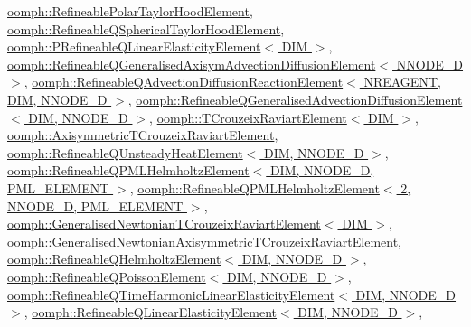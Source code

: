 \hyperlink{classoomph_1_1RefineablePolarTaylorHoodElement_a227872425bda8de11fd94b625eeffbd0}{oomph\+::\+Refineable\+Polar\+Taylor\+Hood\+Element}, \hyperlink{classoomph_1_1RefineableQSphericalTaylorHoodElement_a9b9f57dd6068133cf6b90ff478e96ac5}{oomph\+::\+Refineable\+Q\+Spherical\+Taylor\+Hood\+Element}, \hyperlink{classoomph_1_1PRefineableQLinearElasticityElement_a1c3378ffd265b23eb9702a600742782b}{oomph\+::\+P\+Refineable\+Q\+Linear\+Elasticity\+Element$<$ D\+I\+M $>$}, \hyperlink{classoomph_1_1RefineableQGeneralisedAxisymAdvectionDiffusionElement_aa14f82deb49cf2910b0b15522f48f5a0}{oomph\+::\+Refineable\+Q\+Generalised\+Axisym\+Advection\+Diffusion\+Element$<$ N\+N\+O\+D\+E\+\_\+D $>$}, \hyperlink{classoomph_1_1RefineableQAdvectionDiffusionReactionElement_a3acfe299d116cbac0fcb40ac619687da}{oomph\+::\+Refineable\+Q\+Advection\+Diffusion\+Reaction\+Element$<$ N\+R\+E\+A\+G\+E\+N\+T, D\+I\+M, N\+N\+O\+D\+E\+\_\+D $>$}, \hyperlink{classoomph_1_1RefineableQGeneralisedAdvectionDiffusionElement_a7bbed92069c97890985f84fd996f32a4}{oomph\+::\+Refineable\+Q\+Generalised\+Advection\+Diffusion\+Element$<$ D\+I\+M, N\+N\+O\+D\+E\+\_\+D $>$}, \hyperlink{classoomph_1_1TCrouzeixRaviartElement_a7d150a3bf2b048eb4fc99222822301b0}{oomph\+::\+T\+Crouzeix\+Raviart\+Element$<$ D\+I\+M $>$}, \hyperlink{classoomph_1_1AxisymmetricTCrouzeixRaviartElement_a1b5e91077a94409877b887e2f455d6da}{oomph\+::\+Axisymmetric\+T\+Crouzeix\+Raviart\+Element}, \hyperlink{classoomph_1_1RefineableQUnsteadyHeatElement_a5492bc9cbf7a118fe4c707ba3c7e9685}{oomph\+::\+Refineable\+Q\+Unsteady\+Heat\+Element$<$ D\+I\+M, N\+N\+O\+D\+E\+\_\+D $>$}, \hyperlink{classoomph_1_1RefineableQPMLHelmholtzElement_abaa7c8665be12c2be2eb14f17c5feef8}{oomph\+::\+Refineable\+Q\+P\+M\+L\+Helmholtz\+Element$<$ D\+I\+M, N\+N\+O\+D\+E\+\_\+D, P\+M\+L\+\_\+\+E\+L\+E\+M\+E\+N\+T $>$}, \hyperlink{classoomph_1_1RefineableQPMLHelmholtzElement_abaa7c8665be12c2be2eb14f17c5feef8}{oomph\+::\+Refineable\+Q\+P\+M\+L\+Helmholtz\+Element$<$ 2, N\+N\+O\+D\+E\+\_\+D, P\+M\+L\+\_\+\+E\+L\+E\+M\+E\+N\+T $>$}, \hyperlink{classoomph_1_1GeneralisedNewtonianTCrouzeixRaviartElement_a6eabb8253427c2b4b5ed8f466b009ffc}{oomph\+::\+Generalised\+Newtonian\+T\+Crouzeix\+Raviart\+Element$<$ D\+I\+M $>$}, \hyperlink{classoomph_1_1GeneralisedNewtonianAxisymmetricTCrouzeixRaviartElement_a8f49d7d8329670f70c356aab38ab86be}{oomph\+::\+Generalised\+Newtonian\+Axisymmetric\+T\+Crouzeix\+Raviart\+Element}, \hyperlink{classoomph_1_1RefineableQHelmholtzElement_aef66f141dff057f7ceb589d5e1142292}{oomph\+::\+Refineable\+Q\+Helmholtz\+Element$<$ D\+I\+M, N\+N\+O\+D\+E\+\_\+D $>$}, \hyperlink{classoomph_1_1RefineableQPoissonElement_aa0459e0394b99cdba6b70780dc33688e}{oomph\+::\+Refineable\+Q\+Poisson\+Element$<$ D\+I\+M, N\+N\+O\+D\+E\+\_\+D $>$}, \hyperlink{classoomph_1_1RefineableQTimeHarmonicLinearElasticityElement_a7da8b42083b1b6d0d8d3cf8ad04c8599}{oomph\+::\+Refineable\+Q\+Time\+Harmonic\+Linear\+Elasticity\+Element$<$ D\+I\+M, N\+N\+O\+D\+E\+\_\+D $>$}, \hyperlink{classoomph_1_1RefineableQLinearElasticityElement_a9d830361d2e7c275ff4adda026f70c00}{oomph\+::\+Refineable\+Q\+Linear\+Elasticity\+Element$<$ D\+I\+M, N\+N\+O\+D\+E\+\_\+D $>$}, 